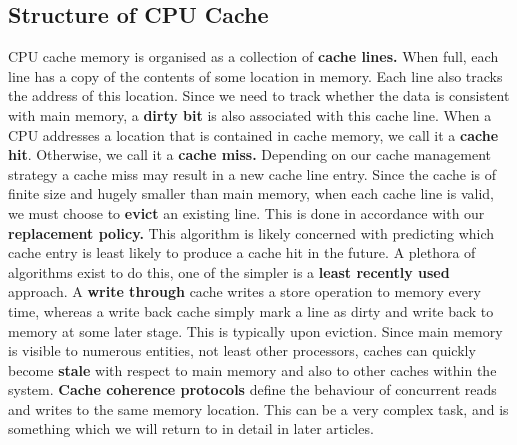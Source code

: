\documentclass[10pt,a4paper]{article}
\begin{document}
\subsection{Structure of CPU Cache}
CPU cache memory is organised as a collection of \textbf{cache lines.} When full, each line has a copy of the contents of some location in memory. Each line also tracks the address of this location. Since we need to track whether the data is consistent with main memory, a \textbf{dirty bit} is also associated with this cache line. When a CPU addresses a location that is contained in cache memory, we call it a \textbf{cache hit}. Otherwise, we call it a \textbf{cache miss.} Depending on our cache management strategy a cache miss may result in a new cache line entry. Since the cache is of finite size and hugely smaller than main  memory, when each cache line is valid, we must choose to \textbf{evict} an existing line. This is done in accordance with our \textbf{replacement policy.}\newline\newline
This algorithm is likely concerned with predicting which cache entry is least likely to produce a cache hit in the future. A plethora of algorithms exist to do this, one of the simpler is a \textbf{least recently used} approach. A \textbf{write through} cache writes a store operation to memory every time, whereas a write back cache simply mark a line as dirty and write back to memory at some later stage. This is typically upon eviction. Since main memory is visible to numerous entities, not least other processors, caches can quickly become \textbf{stale} with respect to main memory and also to other caches within the system. \textbf{Cache coherence protocols} define the behaviour of concurrent reads and writes to the same memory location. This can be a very complex task, and is something which we will return to in detail in later articles. 
\end{document}

